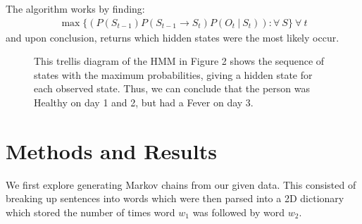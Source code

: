 \documentclass{article}
\begin{document}
The algorithm works by finding:
\begin{align*}
    \max \{ (P(S_{t-1})P(S_{t-1} \rightarrow S_{t})P(O_{t}\ |\ S_{t}))
        : \forall \ S\}\ \forall \ t
\end{align*}
and upon conclusion, returns which hidden states were the most likely occur.

\begin{figure}[H]
    \centering
    \caption{
        This trellis diagram of the HMM in Figure 2 shows the sequence of
        states with the maximum probabilities, giving a hidden state for each
        observed state. Thus, we can conclude that the person was Healthy on
        day 1 and 2, but had a Fever on day 3.
    }
\end{figure}

\section{Methods and Results}
We first explore generating Markov chains from our given data. This consisted
of breaking up sentences into words which were then parsed into a 2D dictionary
which stored the number of times word $w_1$ was followed by word $w_2$.
\end{document}
